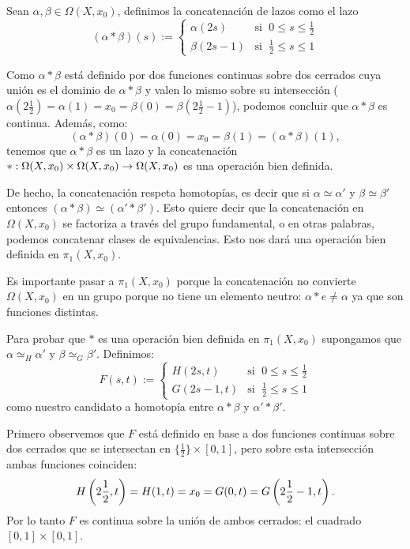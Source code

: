 \documentclass[../../topologia_algebraica]{subfiles}
\begin{document}
\begin{defin}
Sean $\alpha,\beta\in\Omega(X,x_0)$, definimos la concatenaci\'on de lazos como el lazo
\[
  (\alpha*\beta)(s):=
  \begin{cases}
    \alpha(2s) & \text{si }\; 0\leq s\leq \frac{1}{2}\\
    \beta(2s-1) & \text{si }\; \frac{1}{2}\leq s\leq 1
  \end{cases}
\]
\end{defin}

Como $\alpha*\beta$ est\'a definido por dos funciones
continuas sobre dos cerrados cuya uni\'on es el dominio de $\alpha*\beta$ y valen lo mismo sobre su
intersecci\'on ($\alpha(2\frac{1}{2})=\alpha(1)=x_0=\beta(0)=\beta(2\frac{1}{2}-1)$), podemos concluir
que $\alpha*\beta$ es continua. Adem\'as, como:
\[
  (\alpha*\beta)(0)=\alpha(0)=x_0=\beta(1)=(\alpha*\beta)(1),
\]
tenemos que $\alpha*\beta$ es un lazo y la concatenaci\'on
$*:\Omega(X,x_0)\times\Omega(X,x_0)\rightarrow\Omega(X,x_0)$ es una operaci\'on bien definida.

De hecho, la concatenaci\'on respeta homotop\'ias, es decir que si $\alpha\simeq\alpha'$ y
$\beta\simeq\beta'$ entonces $(\alpha*\beta)\simeq(\alpha'*\beta')$. Esto quiere decir que la
concatenaci\'on en $\Omega(X,x_0)$ se factoriza a trav\'es del grupo fundamental, o en otras palabras,
podemos concatenar clases de equivalencias. Esto nos dar\'a una operaci\'on bien definida en
$\pi_1(X,x_0)$.

Es importante pasar a $\pi_1(X,x_0)$ porque la concatenaci\'on no convierte $\Omega(X,x_0)$ en un
grupo porque no tiene un elemento neutro: $\alpha*e\neq\alpha$ ya que son funciones distintas.

Para probar que $*$ es una operaci\'on bien definida en $\pi_1(X,x_0)$ supongamos que
$\alpha\simeq_H\alpha'$ y $\beta\simeq_G\beta'$. Definimos:
\[
  F(s,t):=
  \begin{cases}
    H(2s,t) & \text{si }\; 0\leq s\leq \frac{1}{2}\\
    G(2s-1,t) & \text{si }\; \frac{1}{2}\leq s\leq 1
  \end{cases}
\]
como nuestro candidato a homotop\'ia entre $\alpha*\beta$ y $\alpha'*\beta'$.

Primero observemos que $F$ est\'a definido en base a dos funciones continuas sobre dos cerrados que
se intersectan en $\{\frac{1}{2}\}\times[0,1]$, pero sobre esta intersecci\'on ambas funciones
coinciden:
\[
  H\left( 2\frac{1}{2},t \right)=H(1,t)=x_0=G(0,t)=G\left( 2\frac{1}{2}-1,t \right).
\]
Por lo tanto $F$ es continua sobre la uni\'on de ambos cerrados: el cuadrado $[0,1]\times[0,1]$.
\end{document}
